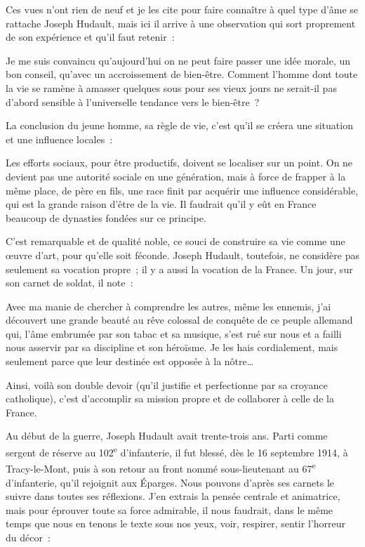 \documentclass[french,twoside]{book} %
\newenvironment{quoteblock}%
  {\begin{quoting}}
  {\end{quoting}}
\newenvironment{quotebar}{%
    \def\FrameCommand{{\color{rubric!10!}\vrule width 0.5em} \hspace{0.9em}}%
    \def\OuterFrameSep{\itemsep} %
    \MakeFramed {\advance\hsize-\width \FrameRestore}
  }%
  {%
    \endMakeFramed
  }
\renewenvironment{quoteblock}%
  {%
    \savenotes
    \setstretch{0.9}
    \normalfont
    \begin{quotebar}
  }
  {%
    \end{quotebar}
    \spewnotes
  }
\begin{document}
\noindent Ces vues n’ont rien de neuf et je les cite pour faire connaître à quel type d’âme se rattache Joseph Hudault, mais ici il arrive à une observation qui sort proprement de son expérience et qu’il faut retenir :‌\par

\begin{quoteblock}
 \noindent Je me suis convaincu qu’aujourd’hui on ne peut faire passer une idée morale, un bon conseil, qu’avec un accroissement de bien-être. Comment l’homme dont toute la vie se ramène à amasser quelques sous pour ses vieux jours ne serait-il pas d’abord sensible à l’universelle tendance vers le bien-être ?‌
 \end{quoteblock}

\noindent La conclusion du jeune homme, sa règle de vie, c’est qu’il se créera une situation et une influence locales :‌\par

\begin{quoteblock}
 \noindent Les efforts sociaux, pour être productifs, doivent se localiser sur un point. On ne devient pas une autorité sociale en une génération, mais à force de frapper à la même place, de père en fils, une race finit par acquérir une influence considérable, qui est la grande raison d’être de la vie. Il faudrait qu’il y eût en France beaucoup de dynasties fondées sur ce principe.‌
 \end{quoteblock}

\noindent C’est remarquable et de qualité noble, ce souci de construire sa vie comme une œuvre d’art, pour qu’elle soit féconde. Joseph Hudault, toutefois, ne considère pas seulement sa vocation propre ; il y a aussi la vocation de la France. Un jour, sur son carnet de soldat, il note :‌\par

\begin{quoteblock}
 \noindent Avec ma manie de chercher à comprendre les autres, même les ennemis, j’ai découvert une grande beauté au rêve colossal de conquête de ce peuple allemand qui, l’âme embrumée par son tabac et sa musique, s’est rué sur nous et a failli nous asservir par sa discipline et son héroïsme. Je les hais cordialement, mais seulement parce que leur destinée est opposée à la nôtre…‌
 \end{quoteblock}

\noindent Ainsi, voilà son double devoir (qu’il justifie et perfectionne par sa croyance catholique), c’est d’accomplir sa mission propre et de collaborer à celle de la France.‌\par
Au début de la guerre, Joseph Hudault avait trente-trois ans. Parti comme sergent de réserve au 102\textsuperscript{e} d’infanterie, il fut blessé, dès le 16 septembre 1914, à Tracy-le-Mont, puis à son retour au front nommé sous-lieutenant au 67\textsuperscript{e} d’infanterie, qu’il rejoignit aux Éparges. Nous pouvons d’après ses carnets le suivre dans toutes ses réflexions. J’en extrais la pensée centrale et animatrice, mais pour éprouver toute sa force admirable, il nous faudrait, dans le même temps que nous en tenons le texte sous nos yeux, voir, respirer, sentir l’horreur du décor :‌\par
\end{document}

